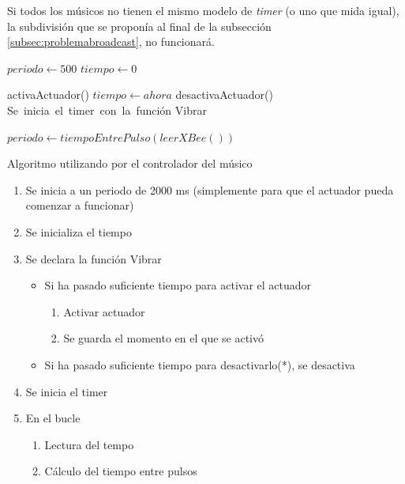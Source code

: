 Si todos los músicos no tienen el mismo modelo de \textit{timer} (o uno que mida igual),
la subdivisión que se proponía al final de la subsección \ref{subsec:problemabroadcast},
no funcionará.\\

\begin{algorithm}
  \begin{algorithmic}[1]
    \State $periodo\gets 500$
    \State $tiempo\gets 0$

       \State activaActuador()
       \State $tiempo \gets ahora$
      \Else {}
        \State desactivaActuador()
         \EndIf
     \EndIf
     \EndFunction\\

     \State Se\ inicia\ el\ timer\ con\ la\ función Vibrar

         \State $periodo\gets tiempoEntrePulso(leerXBee())$
      \EndIf
     \EndWhile
  \end{algorithmic}
  \caption{Algoritmo utilizando por el controlador del músico}
\end{algorithm}

\begin{enumerate}
  \item Se inicia a un periodo de 2000 ms (simplemente para que el actuador pueda comenzar a
  funcionar)
  \item Se inicializa el tiempo
  \item Se declara la función Vibrar
    \begin{itemize}
      \item Si ha pasado suficiente tiempo para activar el actuador
        \begin{enumerate}
          \item Activar actuador
          \item Se guarda el momento en el que se activó
        \end{enumerate}
      \item Si ha pasado suficiente tiempo para desactivarlo(*), se desactiva
    \end{itemize}
  \item Se inicia el timer
  \item En el bucle
    \begin{enumerate}
      \item Lectura del tempo
      \item Cálculo del tiempo entre pulsos
    \end{enumerate}
\end{enumerate}

